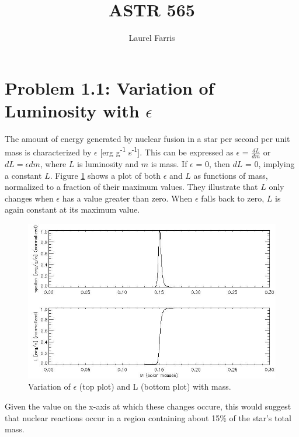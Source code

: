 \documentclass{article}
\begin{document}
\title{ASTR 565} \author{Laurel Farris}

\maketitle

\section{Problem 1.1: Variation of Luminosity with $\epsilon$}

The amount of energy generated by nuclear fusion in a star per second
per unit mass is characterized by $\epsilon$ [erg
g\textsuperscript{-1} s\textsuperscript{-1}]. This can be expressed 
as 
  $\epsilon$ = $\frac{dL}{dm}$ 
  or 
  $dL = \epsilon dm$,                       
where $L$ is luminosity and $m$ is mass. 
If $\epsilon$ = 0, then $dL$ = 0, implying a constant $L$. 
Figure \ref{fig1} shows a plot of both $\epsilon$ and $L$ as functions
 of mass, normalized to a fraction of their maximum values. They 
illustrate
that $L$ only changes when $\epsilon$ has a value
greater than zero. When $\epsilon$ falls back to zero, $L$ is again
constant at its maximum value. 
\begin{figure}[h] \centering
\includegraphics[width=5.0in]{../q01/fig1.jpg} \caption{Variation of
$\epsilon$ (top plot) and L (bottom plot) with mass.} \label{fig1}
\end{figure}

Given the value on the x-axis at which these changes occure, 
this would suggest that nuclear
reactions occur in a region containing about 15\% of the star's
total mass. 
\end{document}
